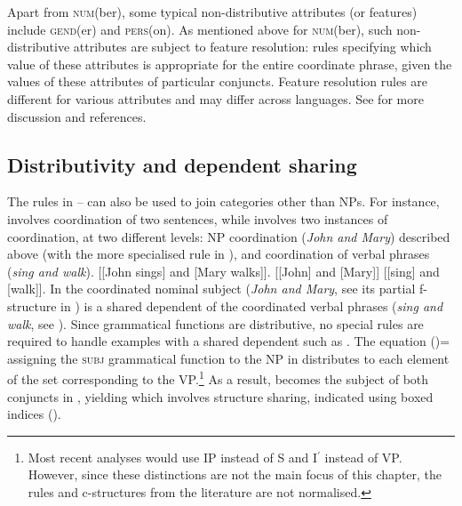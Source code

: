 \documentclass[output=paper]{../langscibook}
\begin{document}
Apart from \textsc{num}(ber), some typical non-distributive attributes
(or features) include \textsc{gend}(er) and
\textsc{pers}(on). As mentioned above for \textsc{num}(ber), such non-distributive attributes are subject to
feature resolution: rules specifying which value of these attributes is
appropriate for the entire coordinate phrase, given the values of
these attributes of particular conjuncts. Feature resolution rules are
different for various attributes and may differ across languages.
%
See  for more discussion and references.

\subsection{Distributivity and dependent sharing}
\label{sec:Coordination:intro:distr:depsh}

The rules in
– can also be
used to join categories other than NPs. For instance, 
involves coordination of two sentences, while 
involves two instances of coordination, at two different levels: NP
coordination (\emph{John and Mary}) described above (with the more
specialised rule in ), and coordination
of verbal phrases (\emph{sing and walk}).
\ea\label{ex:coord:CP} [[John sings] and [Mary walks]].\z
\ea\label{ex:coord:SVagr:PL} [[John] and [Mary]] [[sing] and [walk]].\z
In  the coordinated nominal subject (\emph{John and
  Mary}, see its partial f-structure in
) is a shared dependent of the
coordinated verbal phrases (\emph{sing and walk}, see ).
\ea\label{ex:fstr:VP:sing:walk}
\z
Since grammatical functions are distributive, no special
rules are required to handle examples with a shared dependent such as
. The equation \textsc{(\UP\SUBJ)=\DOWN} assigning the \textsc{subj} grammatical function
to the NP in  distributes to each element of the
set corresponding to the VP.\footnote{Most recent analyses would use IP instead
  of S and I$^{\prime}$ instead of VP. However, since these
  distinctions are not the main focus of this chapter, the rules and
  c-structures from the literature are not normalised.} As a result,
 becomes the subject of both conjuncts in
, yielding
 which involves structure sharing,
indicated using boxed indices (\avm{\1}).
\ea\label{ex:cstr:S:basic}
\z
    
\end{document}
